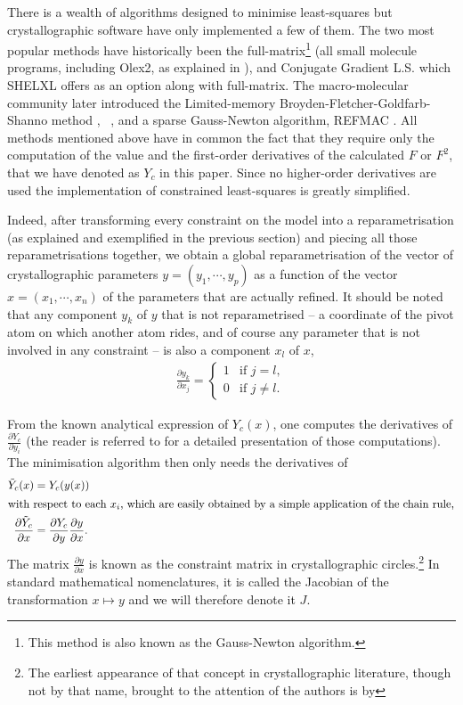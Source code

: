 \documentclass[11pt]{article}
\newcommand{\partialder}[2]{\frac{\partial #1}{\partial #2}}
\begin{document}
There is a wealth of algorithms designed to minimise least-squares but crystallographic software have only implemented a few of them. The two most popular methods have historically been the full-matrix\footnote{This method is also known as the Gauss-Newton algorithm.} (all small molecule programs, including Olex2, as explained in ), and Conjugate Gradient L.S.  which SHELXL offers as an option along with full-matrix.  The macro-molecular community later introduced the Limited-memory Broyden-Fletcher-Goldfarb-Shanno method , \phenixrefine\ \cite{Afonine:2012aa}, and a sparse Gauss-Newton algorithm, REFMAC \cite[section 4 and references therein]{Murshudov:2011aa}. All methods mentioned above have in common the fact that they require only the computation of the value and the first-order derivatives of the calculated $F$ or $F^2$, that we have denoted as $Y_c$ in this paper. Since no higher-order derivatives are used the implementation of constrained least-squares is greatly simplified.

Indeed, after transforming every constraint on the model into a reparametrisation (as explained and exemplified in the previous section) and piecing all those reparametrisations together, we obtain a global reparametrisation of the vector of crystallographic parameters $y = (y_1, \cdots, y_p)$ as a function of the vector $x=(x_1, \cdots, x_n)$ of the parameters that are actually refined. It should be noted that any component $y_k$ of $y$ that is not reparametrised --  a coordinate of the pivot atom on which another atom rides, and of course any parameter that is not involved in any constraint --  is also a component $x_l$ of $x$,  
\begin{align}
\partialder{y_k}{x_j} = \begin{cases} 
   1& \text{if $j=l$},\\
   0& \text{if $j \neq l$}.
   \end{cases}
\nonumber
\end{align}

 From the known analytical expression of $Y_c(x)$, one computes the derivatives of $\partialder{Y_c}{y_i}$ (the reader is referred to  for a detailed presentation of those computations). The minimisation algorithm then only needs the derivatives of
\begin{align}
\tilde{Y}_c(x) &= Y_c(y(x)) \\
 \intertext{with respect to each $x_i$, which are easily obtained by a simple application of the chain rule,}
\partialder{\tilde{Y}_c}{x} &= \partialder{Y_c}{y} \partialder{y}{x}.
\label{eqn:chainrule}
\end{align}
The matrix $\partialder{y}{x}$ is known as the constraint matrix in crystallographic circles.\footnote{The earliest appearance of that concept in crystallographic literature, though not by that name, brought to the attention of the authors is by } In standard mathematical nomenclatures, it is called the Jacobian of the transformation $x \mapsto y$ and we will therefore denote it $J$.
\end{document}
